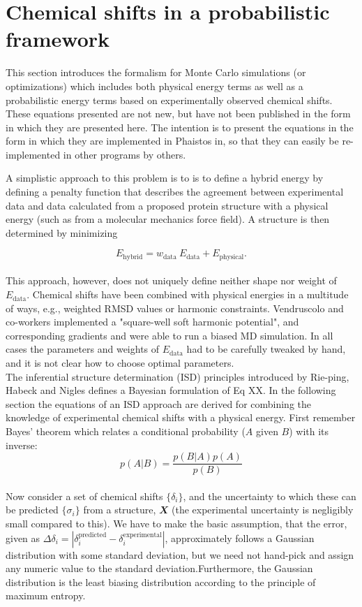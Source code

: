 \chapter{Chemical shifts in a probabilistic framework}

This section introduces the formalism for Monte Carlo simulations (or optimizations) which includes both physical energy terms as well as a probabilistic energy terms based on experimentally observed chemical shifts. These equations presented are not new, but have not been published in the form in which they are presented here. The intention is to present the equations in the form in which they are implemented in Phaistos in,  so that they can easily be re-implemented in other programs by others.

A simplistic approach to this problem is to is to define a hybrid energy by defining a penalty function that describes the agreement between experimental data and data calculated from a proposed protein structure with a physical energy (such as from a molecular mechanics force field). A structure is then determined by minimizing

\begin{equation}
E_{\mathrm{hybrid}}= w_{\mathrm{data}}\ E_{\mathrm{data}}+E_{\mathrm{physical}}.
\end{equation}
\\
This approach, however, does not uniquely define neither shape nor weight of $E_{\mathrm{data}}$. Chemical shifts have been combined with physical energies in a multitude of ways, e.g., weighted RMSD values or harmonic constraints. Vendruscolo and co-workers implemented a "square-well soft harmonic potential", and corresponding gradients and were able to run a biased MD simulation. In all cases the parameters and weights of $E_{\mathrm{data}}$ had to be carefully tweaked by hand, and it is not clear how to choose optimal parameters.
\\

The inferential structure determination (ISD) principles introduced by Rie-ping, Habeck and Nigles defines a Bayesian formulation of Eq XX. In the following section the equations of an ISD approach are derived for combining the knowledge of experimental chemical shifts with a physical energy. First remember Bayes' theorem which relates a conditional probability ($A$ given $B$) with its inverse:
\begin{equation}
p\left(A | B \right) =\frac{p\left(B | A \right)p\left(A\right)}{p\left(B \right)} 
\end{equation}
\\
Now consider a set of chemical shifts $\{\delta_i\}$, and the uncertainty to which these can be predicted $\{\sigma_i\}$ from a structure, $\mathbfit X$ (the experimental uncertainty is negligibly small compared to this). We have to make the basic assumption, that the error, given as $\Delta\delta_i = \left| \delta_i^{\mathrm{predicted}} - \delta_i^{\mathrm{experimental}}\right|$, approximately follows a Gaussian distribution with some standard deviation, but we need not hand-pick and assign any numeric value to the standard deviation.Furthermore, the Gaussian distribution is the least biasing distribution according to the principle of maximum entropy.


